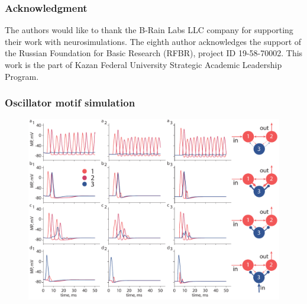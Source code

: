 \documentclass[12pt, aspectratio=169]{beamer}
\begin{document}
\begin{frame}
  \frametitle{Acknowledgment}
The authors would like to thank the B-Rain Labs LLC company for supporting their work with neurosimulations. The eighth author acknowledges the support of the Russian Foundation for Basic Research (RFBR), project ID 19-58-70002. 
This work is the part of Kazan Federal University Strategic Academic Leadership Program. 

\end{frame}
\begin{frame}
  \frametitle{Oscillator motif simulation}
  \begin{figure}
    \includegraphics[width=0.7\linewidth]{OM_sim}
  \end{figure}
\end{frame}
\end{document}
